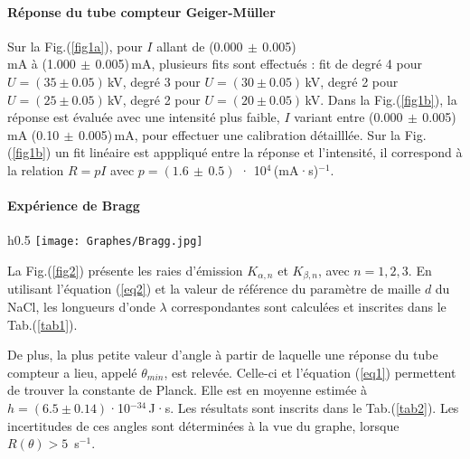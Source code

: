 \documentclass[a4paper, 12pt,oneside]{article}
\begin{document}
\paragraph{Réponse du tube compteur Geiger-Müller}
Sur la Fig.(\ref{fig1a}), pour $I$ allant de (0.000$\,\pm\,$0.005)\\mA à (1.000$\,\pm\,$0.005)\,mA, plusieurs fits sont effectués : fit de degré 4 pour $U=(35\pm0.05)$\,kV,  degré 3 pour $U=(30\pm0.05)$\,kV, degré 2 pour $U=(25\pm0.05)$\,kV, degré 2 pour $U=(20\pm0.05)$\,kV. Dans la Fig.(\ref{fig1b}), la réponse est évaluée avec une intensité plus faible, $I$ variant entre  (0.000$\,\pm\,$0.005)\,mA (0.10$\,\pm\,$0.005)\,mA, pour effectuer une calibration détailllée. Sur la Fig.(\ref{fig1b}) un fit linéaire est apppliqué entre la réponse et l’intensité, il correspond à la relation $R=pI$ avec $p=(1.6\,\pm\,0.5)$ · 10$^4$\,(mA·s)$^{-1}$.
\vspace{-0.4cm}
\paragraph{Expérience de Bragg}
\setlength{\intextsep}{5pt}

\begin{wrapfigure}{h}{0.5\textwidth}
\vspace{-1cm}
    \centering
    \texttt{[image: Graphes/Bragg.jpg]}
    \captionsetup{justification=centering}
    \caption{Diffractogramme du NaCl pour différentes tensions et mise en évidence des raies d'émission $K_{\alpha,n}$ et $K_{\beta,n}$, avec $n=1,2,3$.}
    \label{fig2}
\end{wrapfigure}

La Fig.(\ref{fig2}) présente les raies d'émission $K_{\alpha,n}$ et $K_{\beta,n}$, avec $n=1,2,3$. 
En utilisant l'équation (\ref{eq2}) et la valeur de référence du paramètre de maille $d$ du NaCl, les longueurs d'onde $\lambda$ correspondantes sont calculées et inscrites dans le Tab.(\ref{tab1}).

De plus, la plus petite valeur d'angle à partir de laquelle une réponse du tube compteur a lieu, appelé $\theta_{min}$, est relevée. Celle-ci et l'équation (\ref{eq1}) permettent de trouver la constante de Planck. Elle est en moyenne estimée à $h=(6.5\pm0.14)$·10$^{-34}$\,J·s. Les résultats sont inscrits dans le Tab.(\ref{tab2}). Les incertitudes de ces angles sont déterminées à la vue du graphe, lorsque $R(\theta)>5\,$ s$^{-1}$.
\end{document}
